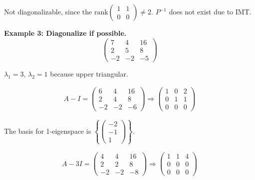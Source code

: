 \noindent
Not diagonalizable, since the \(\text{rank} \begin{pmatrix}
        1 & 1 \\ 0 & 0
    \end{pmatrix} \ne 2\). \(P^{-1}\) does not exist due to IMT.

\noindent
\newline
\textbf{Example 3: Diagonalize if possible.}
\begin{equation}
    \begin{pmatrix}
        7 & 4 & 16 \\ 2 & 5 & 8 \\ -2 & -2 & -5
    \end{pmatrix}
\end{equation}

\noindent
\(\lambda_1 = 3\), \(\lambda_2 = 1\) because upper triangular. 

\begin{align}
    A - I = \begin{pmatrix}
        6 & 4 & 16 \\ 2 & 4 & 8 \\ -2 & -2 & -6
    \end{pmatrix} \Rightarrow \begin{pmatrix}
        1 & 0 & 2 \\
        0 & 1 & 1 \\
        0 & 0 & 0
    \end{pmatrix}
\end{align}

\noindent
The basis for 1-eigenspace is \(\left\{ \begin{pmatrix}
    -2 \\ -1 \\ 1
\end{pmatrix} \right\}\). 

\begin{align}
    A - 3I = \begin{pmatrix}
        4 & 4 & 16 \\
        2 & 2 & 8 \\
        -2 & -2 & -8
    \end{pmatrix} \Rightarrow \begin{pmatrix}
        1 & 1 & 4 \\
        0 & 0 & 0 \\
        0 & 0 & 0
    \end{pmatrix}
\end{align}

